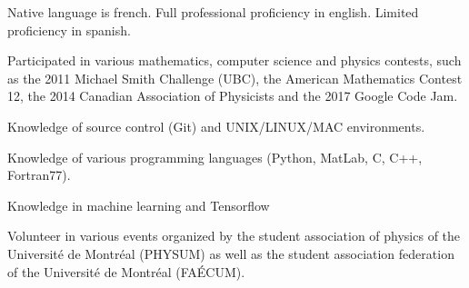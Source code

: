 \begin{cvletter}
{
  \begin{cvitems}
    \item {Native language is french. Full professional proficiency in english. Limited proficiency in spanish.}
    \item{Participated in various mathematics, computer science and physics contests, such as the 2011 Michael Smith Challenge (UBC), the American Mathematics Contest 12, the 2014 Canadian Association of Physicists and the 2017 Google Code Jam.}
    \item{Knowledge of source control (Git) and UNIX/LINUX/MAC environments.}
    \item{Knowledge of various programming languages (Python, MatLab, C, C++, Fortran77).}
    \item{Knowledge in machine learning and Tensorflow}
    \item{Volunteer in various events organized by the student association of physics of the Universit\'e de Montr\'eal (PHYSUM) as well as the student association federation of the Universit\'e de Montr\'eal (FA\'ECUM).}
  \end{cvitems}
 }
\end{cvletter}
